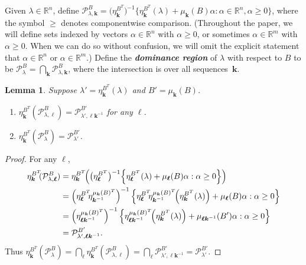 \documentclass{amsart}
\newtheorem{lemma}[proposition]{Lemma}
\theoremstyle{definition}
\theoremstyle{remark}
\numberwithin{equation}{section}
\newcommand{\newword}[1]{\textbf{\emph{#1}}}
\newcommand{\reals}{\mathbb R}
\newcommand{\set}[1]{{\lbrace #1 \rbrace}}
\newcommand{\sett}[1]{{\bigl\lbrace #1 \bigr\rbrace}}
\newcommand{\settt}[1]{{\Bigl\lbrace #1 \Bigr\rbrace}}
\newcommand{\0}{{\mathbf{0}}}
\newcommand{\kk}{{\boldsymbol{k}}}
\renewcommand{\ll}{{\boldsymbol\ell}}
\renewcommand{\P}{\mathcal{P}}
\begin{document}
Given $\lambda\in\reals^n$, define $\P^B_{\lambda,\kk}=\bigl(\eta_{\kk}^{B^T}\bigr)^{-1}\sett{\eta_\kk^{B^T}(\lambda)+\mu_\kk(B)\alpha:\alpha\in\reals^n,\alpha\ge0}$, where the symbol $\ge$ denotes componentwise comparison.
(Throughout the paper, we will define sets indexed by vectors $\alpha\in\reals^n$ with $\alpha\ge0$, or sometimes $\alpha\in\reals^m$ with $\alpha\ge0$.
When we can do so without confusion, we will omit the explicit statement that $\alpha\in\reals^n$ or $\alpha\in\reals^m$.)
Define the \newword{dominance region} of $\lambda$ with respect to $B$ to be $\P^B_\lambda=\bigcap_\kk\P^B_{\lambda,\kk}$, where the intersection is over all sequences~$\kk$.
\begin{lemma}\label{shift}
Suppose $\lambda'=\eta^{B^T}_\kk(\lambda)$ and $B'=\mu_\kk(B)$.
\begin{enumerate}[label=\bf\arabic*., ref=\arabic*]
\item \label{shift one}
$\eta^{B^T}_\kk\!\!(\P^B_{\lambda,\ll})=\P^{B'}_{\lambda',\ll\kk^{-1}}$ for any $\ll$.
\item \label{shift all}
$\eta^{B^T}_\kk\!\!(\P^B_\lambda)=\P^{B'}_{\lambda'}$.
\end{enumerate}
\end{lemma}
\begin{proof}
For any $\ll$,
\begin{align*}
\eta^{B^T}_\kk\!\!(\P^B_{\lambda,\ll})
&=\eta^{B^T}_\kk\!\!\left(\bigl(\eta_{\ll}^{B^T}\bigr)^{-1}\settt{\eta_\ll^{B^T}(\lambda)+\mu_\ll(B)\alpha:\alpha\ge0}\right)\\
&=\left(\eta^{B^T}_\ll\!\!\eta_{\kk^{-1}}^{\mu_\kk(B)^T}\right)^{-1}\settt{\eta_\ll^{B^T}\!\!\eta_{\kk^{-1}}^{\mu_\kk(B)^T}\!\!\left(\eta^{B^T}_\kk(\lambda)\right)+\mu_\ll(B)\alpha:\alpha\ge0}\\
&=\left(\eta^{\mu_\kk(B)^T}_{\ll\kk^{-1}}\right)^{-1}\settt{\eta^{\mu_\kk(B)^T}_{\ll\kk^{-1}}\!\!\left(\eta^{B^T}_\kk(\lambda)\right)+\mu_{\ll\kk^{-1}}(B')\alpha:\alpha\ge0}\\
&=\P^{B'}_{\lambda',\ll\kk^{-1}}.
\end{align*}
  Thus $\eta^{B^T}_\kk\!\!(\P^B_\lambda)=\bigcap_\ll\eta^{B^T}_\kk\!\!(\P^B_{\lambda,\ll})=\bigcap_\ll\P^{B'}_{\lambda',\ll\kk^{-1}}=\P^{B'}_{\lambda'}$.
\end{proof}
\end{document}

